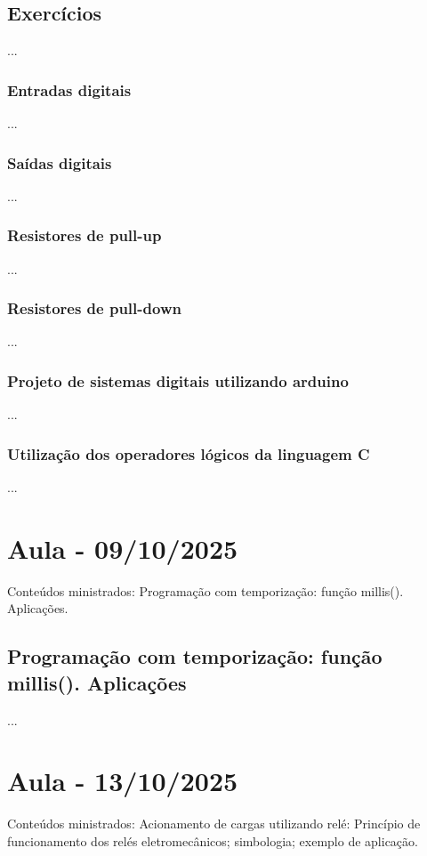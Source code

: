 \documentclass{article}
\begin{document}
\subsection{Exercícios}
...

\subsubsection{Entradas digitais}
...

\subsubsection{Saídas digitais}
...

\subsubsection{Resistores de pull-up}
...

\subsubsection{Resistores de pull-down}
...

\subsubsection{Projeto de sistemas digitais utilizando arduino}
...

\subsubsection{Utilização dos operadores lógicos da linguagem C}
...


\section{Aula - 09/10/2025}
Conteúdos ministrados: Programação com temporização: função millis(). Aplicações.

\subsection{Programação com temporização: função millis(). Aplicações}
...

\section{Aula - 13/10/2025}
Conteúdos ministrados: Acionamento de cargas utilizando relé: Princípio de funcionamento dos relés eletromecânicos; simbologia; exemplo de aplicação.
\end{document}
